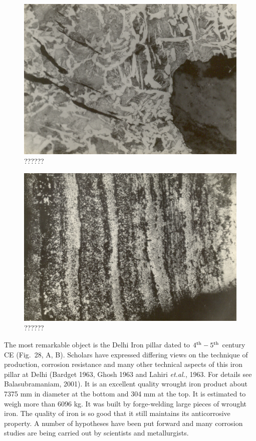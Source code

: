 \newpage

\begin{figure}[H]
\renewcommand{\thefigure}{27B}
\includegraphics[scale=0.85]{images/chapter-4/fig027B.jpg}
\caption{??????}\label{chapter-4-fig27B}
\end{figure}

\begin{figure}[H]
\renewcommand{\thefigure}{27C}
\includegraphics[scale=0.75]{images/chapter-4/fig027C.jpg}
\caption{??????}\label{chapter-4-fig27C}
\end{figure}

\newpage

The most remarkable object is the Delhi Iron pillar dated to $4^{\rm th} -5^{\rm th}$ century CE (Fig.~28, A, B). Scholars have expressed differing views on the technique of production, corrosion resistance and many other technical aspects of this iron pillar at Delhi (Bardget 1963, Ghosh 1963 and Lahiri {\it et.al.}, 1963. For details see Balasubramaniam, 2001). It is an excellent quality wrought iron product about 7375 mm in diameter at the bottom and 304 mm at the top. It is estimated to weigh more than 6096 kg. It was built by forge-welding large pieces of wrought iron. The quality of iron is so good that it still maintains its anticorrosive property. A number of hypotheses have been put forward and many corrosion studies are being carried out by scientists and metallurgists. 

